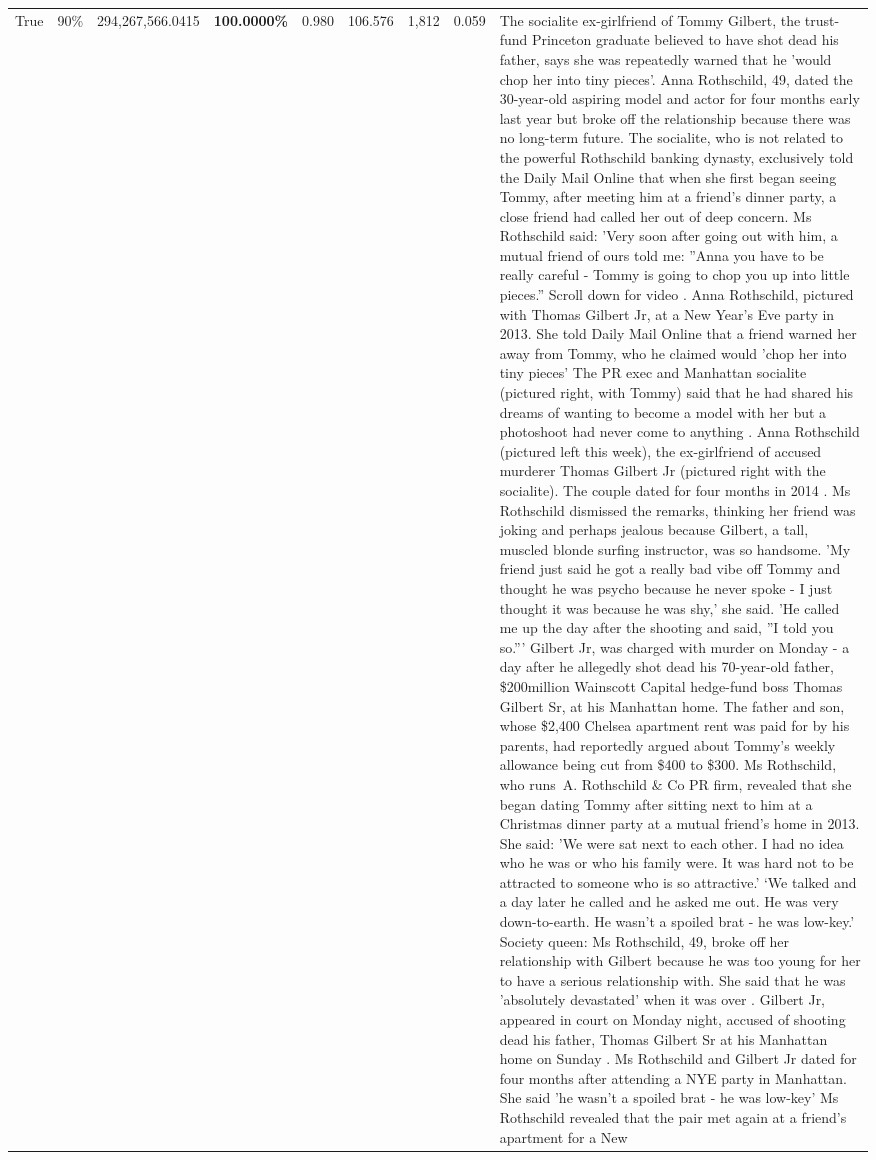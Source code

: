\begin{table}[H]
\begin{tabular}{lllrlllll}
True & 90\% & 294,267,566.0415 & \bfseries \color{red} 100.0000\% & 0.980 & 106.576 & 1,812 & 0.059 & The socialite ex-girlfriend of Tommy Gilbert, the trust-fund Princeton graduate believed to have shot dead his father, says she was repeatedly warned that he 'would chop her into tiny pieces'. Anna Rothschild, 49, dated the 30-year-old aspiring model and actor for four months early last year but broke off the relationship because there was no long-term future. The socialite, who is not related to the powerful Rothschild banking dynasty, exclusively told the Daily Mail Online that when she first began seeing Tommy, after meeting him at a friend's dinner party, a close friend had called her out of deep concern. Ms Rothschild said: 'Very soon after going out with him, a mutual friend of ours told me: ''Anna you have to be really careful - Tommy is going to chop you up into little pieces.'' Scroll down for video . Anna Rothschild, pictured with Thomas Gilbert Jr, at a New Year's Eve party in 2013. She told Daily Mail Online that a friend warned her away from Tommy, who he claimed would 'chop her into tiny pieces' The PR exec and Manhattan socialite (pictured right, with Tommy) said that he had shared his dreams of wanting to become a model with her but a photoshoot had never come to anything . Anna Rothschild (pictured left this week), the ex-girlfriend of accused murderer Thomas Gilbert Jr (pictured right with the socialite). The couple dated for four months in 2014 . Ms Rothschild dismissed the remarks, thinking her friend was joking and perhaps jealous because Gilbert, a tall, muscled blonde surfing instructor, was so handsome. 'My friend just said he got a really bad vibe off Tommy and thought he was psycho because he never spoke - I just thought it was because he was shy,' she said. 'He called me up the day after the shooting and said, ''I told you so.''' Gilbert Jr, was charged with murder on Monday - a day after he allegedly shot dead his 70-year-old father, \$200million Wainscott Capital hedge-fund boss Thomas Gilbert Sr, at his Manhattan home. The father and son, whose \$2,400 Chelsea apartment rent was paid for by his parents, had reportedly argued about Tommy's weekly allowance being cut from \$400 to \$300. Ms Rothschild, who runs A. Rothschild \& Co PR firm, revealed that she began dating Tommy after sitting next to him at a Christmas dinner party at a mutual friend's home in 2013. She said: 'We were sat next to each other. I had no idea who he was or who his family were. It was hard not to be attracted to someone who is so attractive.' ‘We talked and a day later he called and he asked me out. He was very down-to-earth. He wasn’t a spoiled brat - he was low-key.’ Society queen: Ms Rothschild, 49, broke off her relationship with Gilbert because he was too young for her to have a serious relationship with. She said that he was 'absolutely devastated' when it was over . Gilbert Jr, appeared in court on Monday night, accused of shooting dead his father, Thomas Gilbert Sr at his Manhattan home on Sunday . Ms Rothschild and Gilbert Jr dated for four months after attending a NYE party in Manhattan. She said 'he wasn't a spoiled brat - he was low-key' Ms Rothschild revealed that the pair met again at a friend’s apartment for a New 
\end{tabular}
\end{table}

